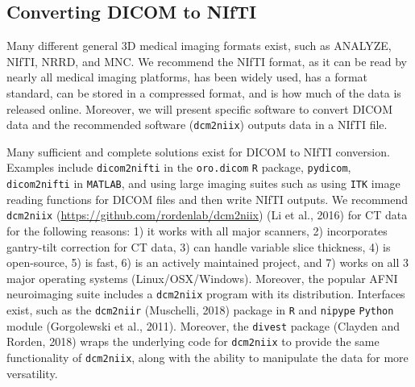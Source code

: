 \documentclass[utf8]{frontiersSCNS}
\begin{document}
\hypertarget{converting-dicom-to-nifti}{%
\subsection{Converting DICOM to NIfTI}\label{converting-dicom-to-nifti}}

Many different general 3D medical imaging formats exist, such as ANALYZE, NIfTI, NRRD, and MNC. We recommend the NIfTI format, as it can be read by nearly all medical imaging platforms, has been widely used, has a format standard, can be stored in a compressed format, and is how much of the data is released online. Moreover, we will present specific software to convert DICOM data and the recommended software (\texttt{dcm2niix}) outputs data in a NIfTI file.

Many sufficient and complete solutions exist for DICOM to NIfTI conversion. Examples include \texttt{dicom2nifti} in the \texttt{oro.dicom} \texttt{R} package, \texttt{pydicom}, \texttt{dicom2nifti} in \texttt{MATLAB}, and using large imaging suites such as using \texttt{ITK} image reading functions for DICOM files and then write NIfTI outputs. We recommend \texttt{dcm2niix} (\url{https://github.com/rordenlab/dcm2niix}) (Li et al., 2016) for CT data for the following reasons: 1) it works with all major scanners, 2) incorporates gantry-tilt correction for CT data, 3) can handle variable slice thickness, 4) is open-source, 5) is fast, 6) is an actively maintained project, and 7) works on all 3 major operating systems (Linux/OSX/Windows). Moreover, the popular AFNI neuroimaging suite includes a \texttt{dcm2niix} program with its distribution. Interfaces exist, such as the \texttt{dcm2niir} (Muschelli, 2018) package in \texttt{R} and \texttt{nipype} \texttt{Python} module (Gorgolewski et al., 2011). Moreover, the \texttt{divest} package (Clayden and Rorden, 2018) wraps the underlying code for \texttt{dcm2niix} to provide the same functionality of \texttt{dcm2niix}, along with the ability to manipulate the data for more versatility.
\end{document}
